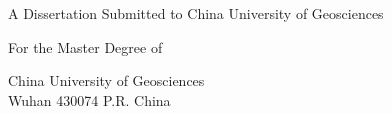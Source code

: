 \clearpage
\thispagestyle{empty}

\begin{center}
  A Dissertation Submitted to China University of Geosciences

  \vspace{0.9cm}
  For the Master Degree of \thesisMajorEn

  \vspace{1.2cm}
  {\bfseries \thesisTitleEN}

  \vspace{1.4cm}
  \lineskip=0pt\lineskiplimit=0pt
  \noindent{}\par
  \noindent{}\par
  \noindent{}\par

  \vspace{1.6cm}
  China University of Geosciences \\
  Wuhan 430074 P.R. China
\end{center}
